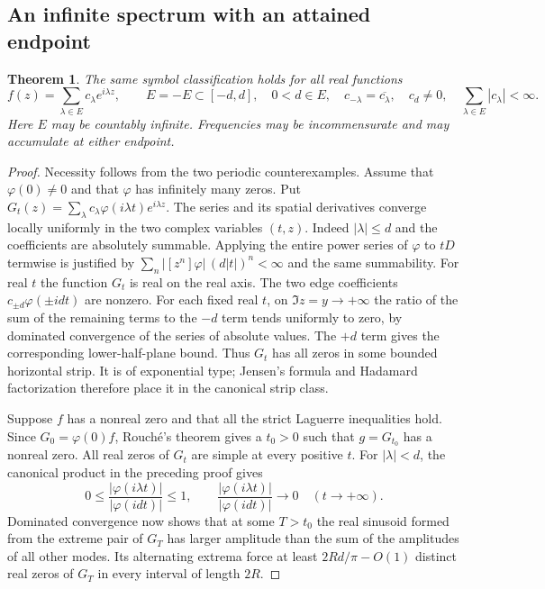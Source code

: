 \documentclass[11pt]{article}
\newtheorem{theorem}{Theorem}[section]
\begin{document}
\subsection{An infinite spectrum with an attained endpoint}
\label{sec:purepoint}

\begin{theorem}
The same symbol classification holds for all real functions
\[
 f(z)=\sum_{\lambda\in E}c_{\lambda}e^{i\lambda z},\qquad
 E=-E\subset[-d,d],\quad 0<d\in E,\quad
 c_{-\lambda}=\overline{c_{\lambda}},\quad
 c_d\ne0,\quad \sum_{\lambda\in E}|c_\lambda|<\infty .
\]
Here $E$ may be countably infinite. Frequencies may be
incommensurate and may accumulate at either endpoint.
\end{theorem}

\begin{proof}
Necessity follows from the two periodic counterexamples. Assume that
$\varphi(0)\ne0$ and that $\varphi$ has infinitely many zeros.
Put $G_t(z)=\sum_{\lambda} c_\lambda\varphi(i\lambda t)e^{i\lambda z}$.
The series and its spatial derivatives converge locally uniformly in
the two complex variables $(t,z)$. Indeed $|\lambda|\le d$ and
the coefficients are absolutely summable. Applying the entire power
series of $\varphi$ to $tD$ termwise is justified by
$\sum_n |[z^n]\varphi|\,(d|t|)^n<\infty$ and the same summability.
For real $t$ the function $G_t$ is real on the real axis. The two
edge coefficients $c_{\pm d}\varphi(\pm idt)$ are nonzero. For each
fixed real $t$, on $\Im z=y\to+\infty$ the ratio of the sum of the
remaining terms to the $-d$ term tends uniformly to zero, by
dominated convergence of the series of absolute values. The $+d$
term gives the corresponding lower-half-plane bound. Thus $G_t$
has all zeros in some bounded horizontal strip. It is of exponential
type; Jensen's formula and Hadamard factorization therefore place it
in the canonical strip class.

Suppose $f$ has a nonreal zero and that all the strict Laguerre
inequalities hold. Since $G_0=\varphi(0)f$, Rouch\'e's theorem
gives a $t_0>0$ such that $g=G_{t_0}$ has a nonreal zero. All real
zeros of $G_t$ are simple at every positive $t$. For $|\lambda|<d$,
the canonical product in the preceding proof gives
\[
 0\le\frac{|\varphi(i\lambda t)|}{|\varphi(idt)|}\le 1,
 \qquad
 \frac{|\varphi(i\lambda t)|}{|\varphi(idt)|}\longrightarrow0
 \quad(t\to+\infty).
\]
Dominated convergence now shows that at some $T>t_0$ the real
sinusoid formed from the extreme pair of $G_T$ has larger amplitude
than the sum of the amplitudes of all other modes. Its alternating
extrema force at least $2Rd/\pi-O(1)$ distinct real zeros of
$G_T$ in every interval of length $2R$.


\end{proof}
\end{document}
